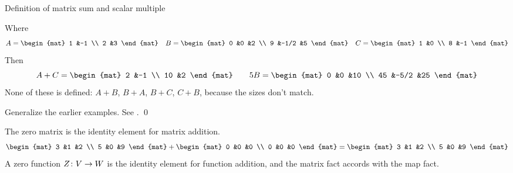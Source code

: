 \documentclass[10pt,t]{beamer}
\begin{document}
\begin{frame}{Definition of matrix sum and scalar multiple}

\pause
\ex
Where
\begin{equation*}
  A=
  \begin{mat}
    1  &-1 \\
    2  &3
  \end{mat}
  \quad
  B=
  \begin{mat}
    0  &0     &2  \\
    9  &-1/2  &5
  \end{mat}
  \quad
  C=
  \begin{mat}
    1  &0 \\
    8  &-1
  \end{mat}
\end{equation*}
Then
\begin{equation*}
  A+C=
  \begin{mat}
    2  &-1  \\
    10 &2
  \end{mat}
  \qquad
  5B=
  \begin{mat}
    0  &0    &10 \\
    45 &-5/2 &25 
  \end{mat}
\end{equation*}
None of these is defined: $A+B$, $B+A$, 
$B+C$, $C+B$, because the sizes don't match.
\end{frame}




\begin{frame}
\th[th:MatOpsRepMapOps]

\pause
\pf
Generalize the earlier examples.
See \hspace{-0.25em}.
\qed

\pause
\medskip
\df[df:ZeroMatrix]

\pause
\medskip
\ex
The zero matrix is the identity element for matrix addition.
\begin{equation*}
  \begin{mat}
    3 &1 &2 \\
    5 &0 &9
  \end{mat}
  +
  \begin{mat}
    0 &0 &0 \\
    0 &0 &0
  \end{mat}
  =
  \begin{mat}
    3 &1 &2 \\
    5 &0 &9
  \end{mat}
\end{equation*}
A zero function
$\mbox{$Z\colon V\to W$}$ is the identity element for
function addition, and the matrix fact accords with the map fact. 
\end{frame}
\end{document}
